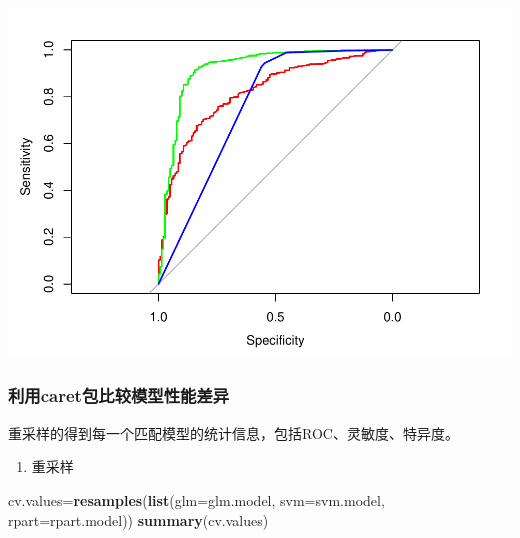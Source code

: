 \documentclass[
]{article}
\newenvironment{Shaded}{\begin{snugshade}}{\end{snugshade}}
\newcommand{\DataTypeTok}[1]{\textcolor[rgb]{0.13,0.29,0.53}{#1}}
\newcommand{\KeywordTok}[1]{\textcolor[rgb]{0.13,0.29,0.53}{\textbf{#1}}}
\newcommand{\NormalTok}[1]{#1}
\providecommand{\tightlist}{%
  \setlength{\itemsep}{0pt}\setlength{\parskip}{0pt}}
\begin{document}
\includegraphics{R_FinalReport_files/figure-latex/unnamed-chunk-48-1.pdf}

\hypertarget{ux5229ux7528caretux5305ux6bd4ux8f83ux6a21ux578bux6027ux80fdux5deeux5f02}{%
\subsubsection{利用caret包比较模型性能差异}\label{ux5229ux7528caretux5305ux6bd4ux8f83ux6a21ux578bux6027ux80fdux5deeux5f02}}

重采样的得到每一个匹配模型的统计信息，包括ROC、灵敏度、特异度。

\begin{enumerate}
\def\labelenumi{\arabic{enumi}.}
\tightlist
\item
  重采样
\end{enumerate}

\begin{Shaded}
\begin{Highlighting}[]
\NormalTok{cv.values=}\KeywordTok{resamples}\NormalTok{(}\KeywordTok{list}\NormalTok{(}\DataTypeTok{glm=}\NormalTok{glm.model,}
                         \DataTypeTok{svm=}\NormalTok{svm.model,}
                         \DataTypeTok{rpart=}\NormalTok{rpart.model))}
\KeywordTok{summary}\NormalTok{(cv.values)}
\end{Highlighting}
\end{Shaded}
\end{document}
